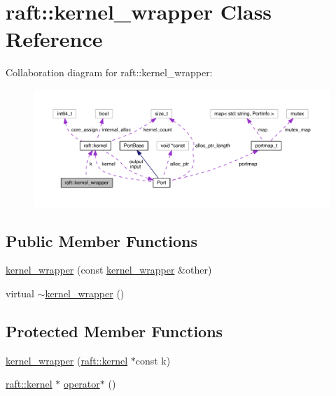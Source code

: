 \hypertarget{classraft_1_1kernel__wrapper}{}\section{raft\+:\+:kernel\+\_\+wrapper Class Reference}
\label{classraft_1_1kernel__wrapper}


Collaboration diagram for raft\+:\+:kernel\+\_\+wrapper\+:
\nopagebreak
\begin{figure}[H]
\begin{center}
\leavevmode
\includegraphics[width=350pt]{classraft_1_1kernel__wrapper__coll__graph}
\end{center}
\end{figure}
\subsection*{Public Member Functions}
\begin{DoxyCompactItemize}
\item 
\hyperlink{classraft_1_1kernel__wrapper_a4d8b3a7bb72e1c09bd0088e4b3751ea3}{kernel\+\_\+wrapper} (const \hyperlink{classraft_1_1kernel__wrapper}{kernel\+\_\+wrapper} \&other)
\item 
virtual \hyperlink{classraft_1_1kernel__wrapper_a3555642f75df44b60d5cd3f6f2a6b0bd}{$\sim$kernel\+\_\+wrapper} ()
\end{DoxyCompactItemize}
\subsection*{Protected Member Functions}
\begin{DoxyCompactItemize}
\item 
\hyperlink{classraft_1_1kernel__wrapper_adecf16d07a9e14109e584b7c4b93bf13}{kernel\+\_\+wrapper} (\hyperlink{classraft_1_1kernel}{raft\+::kernel} $\ast$const k)
\item 
\hyperlink{classraft_1_1kernel}{raft\+::kernel} $\ast$ \hyperlink{classraft_1_1kernel__wrapper_a3275179f2fabef65a683a24eeff2088e}{operator$\ast$} ()
\end{DoxyCompactItemize}
